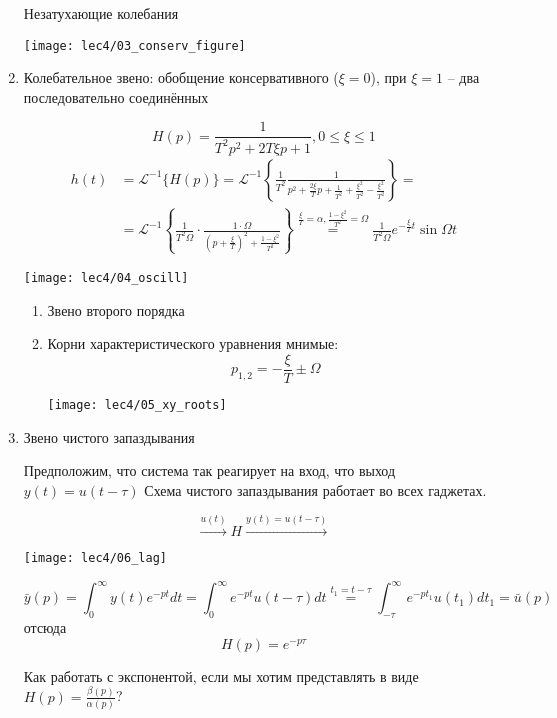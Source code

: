 \documentclass[main.tex]{subfiles}
\begin{document}
\begin{enumerate}[noitemsep]
    Незатухающие колебания

    \texttt{[image: lec4/03\_conserv\_figure]}

    \item Колебательное звено: обобщение консервативного ($\xi = 0$), при $\xi=1$ -- два последовательно соединённых %

    $$ H(p) = \frac{1}{T^2p^2 + 2 T \xi p + 1}, 0 \le \xi \le 1 $$
    \begin{align*}
        h(t) & = \mathcal{L}^{-1}\{H(p)\} = \mathcal{L}^{-1} \left\{ \frac{1}{T^2} \frac{1}{p^2 + \frac{2 \xi}{T} p + \frac{1}{T^2} + \frac{\xi^2}{T^2} - \frac{\xi^2}{T^2}} \right\} = \\
        & = \mathcal{L}^{-1} \left\{ \frac{1}{T^2 \Omega} \cdot \frac{1 \cdot \Omega}{ (p + \frac{\xi}{T})^2 + \frac{1 - \xi^2}{T^2} } \right\} \overset{ \frac{\xi}{T} = \alpha, \frac{1 - \xi^2}{T^2} = \Omega } = \frac{1}{T^2 \Omega} e^{ - \frac{\xi}{T} t} \sin \Omega t
    \end{align*}

    \texttt{[image: lec4/04\_oscill]}

    \begin{enumerate}[noitemsep]
        \item Звено второго порядка
        \item Корни характеристического уравнения мнимые:
        $$ p_{1,2} = - \frac{\xi}{T} \pm \Omega $$

        \texttt{[image: lec4/05\_xy\_roots]}

    \end{enumerate}

    \item Звено чистого запаздывания

    Предположим, что система так реагирует на вход, что выход $ y(t) = u(t-\tau) $
    Схема чистого запаздывания работает во всех гаджетах.

    $$ \xrightarrow{u(t)} \boxed{H} \xrightarrow{y(t)=u(t-\tau)} $$

    \texttt{[image: lec4/06\_lag]}

    $$ \bar y(p) = \int_{0}^{\infty} y(t)e^{-pt}dt = \int_{0}^{\infty} e^{-pt}u(t-\tau) dt \overset{t_1=t-\tau}= \int_{-\tau}^{\infty}e^{-pt_1}u(t_1)dt_1 = \bar u(p)  $$
    отсюда
    $$ \boxed{H(p)=e^{-p\tau}} $$

    Как работать с экспонентой, если мы хотим представлять в виде $ H(p) = \frac{\beta(p)}{\alpha(p)} $?


\end{enumerate}
\end{document}
